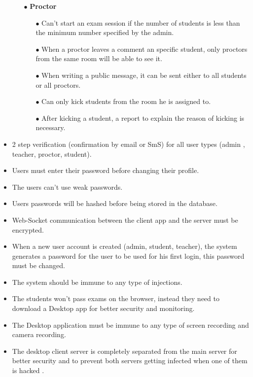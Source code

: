 \documentclass[]{uc2pfecaneva}
\begin{document}
\begin{itemize}
\begin{itemize}
            \item[$\bullet$]\textbf{Proctor}
            \begin{itemize}
                \item[$\bullet$] Can’t start an exam session if the number of students is less than the minimum number specified by the admin.
                \item[$\bullet$] When a proctor leaves a comment an specific student, only proctors from the same room will be able to see it.
                \item[$\bullet$] When writing a public message, it can be sent either to all students or all proctors.
                \item[$\bullet$] Can only kick students from the room he is assigned to.
                \item[$\bullet$] After kicking a student, a report to explain the reason of kicking is necessary.
            \end{itemize}

        \end{itemize}
        \item 2 step verification (confirmation by email or SmS) for all user types (admin , teacher, proctor, student).
        \item Users must enter their password before changing their profile.
        \item The users can't use weak passwords.
        \item Users passwords will be hashed before being stored in the database.
        \item Web-Socket communication between the client app and the server must be encrypted.
        \item When a new user account is created (admin, student, teacher), the system generates a password for the user to be used for his first login, this password must be changed.
        \item The system should be immune to any type of injections.
        \item The students won’t pass exams on the browser, instead they need to download a Desktop app for better security and monitoring.
        \item The Desktop application must be immune to any type of screen recording and camera recording.
        \item The desktop client server is completely separated from the main server for better security and to prevent both servers getting infected when one of them is hacked .
    \end{itemize}
\end{document}
